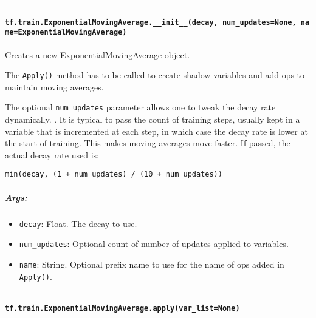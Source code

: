 \begin{center}\rule{0.5\linewidth}{\linethickness}\end{center}

\paragraph{\texorpdfstring{\texttt{tf.train.ExponentialMovingAverage.\_\_init\_\_(decay,\ num\_updates=None,\ name=\textquotesingle{}ExponentialMovingAverage\textquotesingle{})}
}{tf.train.ExponentialMovingAverage.\_\_init\_\_(decay, num\_updates=None, name='ExponentialMovingAverage') }}\label{tf.train.exponentialmovingaverage.ux5fux5finitux5fux5fdecay-numux5fupdatesnone-nameexponentialmovingaverage}

Creates a new ExponentialMovingAverage object.

The \texttt{Apply()} method has to be called to create shadow variables
and add ops to maintain moving averages.

The optional \texttt{num\_updates} parameter allows one to tweak the
decay rate dynamically. . It is typical to pass the count of training
steps, usually kept in a variable that is incremented at each step, in
which case the decay rate is lower at the start of training. This makes
moving averages move faster. If passed, the actual decay rate used is:

\texttt{min(decay,\ (1\ +\ num\_updates)\ /\ (10\ +\ num\_updates))}

\subparagraph{Args: }\label{args-19}

\begin{itemize}
\tightlist
\item
  \texttt{decay}: Float. The decay to use.
\item
  \texttt{num\_updates}: Optional count of number of updates applied to
  variables.
\item
  \texttt{name}: String. Optional prefix name to use for the name of ops
  added in \texttt{Apply()}.
\end{itemize}

\begin{center}\rule{0.5\linewidth}{\linethickness}\end{center}

\paragraph{\texorpdfstring{\texttt{tf.train.ExponentialMovingAverage.apply(var\_list=None)}
}{tf.train.ExponentialMovingAverage.apply(var\_list=None) }}\label{tf.train.exponentialmovingaverage.applyvarux5flistnone}

